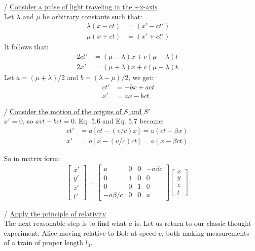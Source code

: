 \documentclass[a4paper,11pt]{article}
\numberwithin{equation}{section}
\begin{document}
 / \underline{Consider a pulse of light traveling in the +x-axis}\\ 
 Let $\lambda$ and $\mu$ be arbitrary constants such that:
 \begin{align*}
 \lambda(x-ct) &= (x' - ct') \\
 \mu(x+ct) &= (x' + ct')
 \end{align*}
 It follows that:
 \begin{align*}
 2ct' &= (\mu-\lambda)x + c(\mu+\lambda)t \\
 2x' &= (\mu+\lambda)x + c(\mu-\lambda)t.
 \end{align*}
 Let $a=(\mu+\lambda)/2$ and $b=(\lambda-\mu)/2$, we get:
 \begin{align}
 ct' &= -bx + act \\
 x' &= ax - bct.
 \end{align}
 
 / \underline{Consider the motion of the origins of $S$ and $S'$}\\
 $x'=0$, so $avt-bct=0$. Eq. 5.6 and Eq. 5.7 become:
 \begin{align}
 ct' &= a[ct-(v/c)x]=a(ct-\beta x) \\
 x' &= a[x -(v/c)ct]=a(x-\beta ct).
 \end{align}
 
 \noindent So in matrix form:
 \begin{gather}
 \begin{bmatrix} x' \\ y' \\ z' \\ t' \end{bmatrix}
 =
 \begin{bmatrix}
 a & 0 & 0 & -a\beta c\\
 0 & 1 & 0 & 0\\
 0 & 0 & 1 & 0\\
 -a\beta/c & 0 & 0 & a
 \end{bmatrix}
 \begin{bmatrix}
 x \\ y \\ z \\ t
 \end{bmatrix}.
 \end{gather}
 
 / \underline{Apply the principle of relativity}\\
 The next reasonable step is to find what $a$ is. Let us return to our classic thought experiment: Alice moving relative to Bob at speed $v$, both making measurements of a train of proper length $l_0$. 
 
\end{document}
